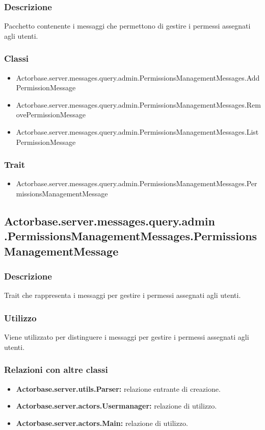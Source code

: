 \documentclass[a4paper]{article}
\begin{document}
			\subsubsection{Descrizione}
				Pacchetto contenente i messaggi che permettono di gestire i permessi assegnati agli utenti.
			\subsubsection{Classi}
				\begin{itemize}
					\item Actorbase.server.messages.query.admin.PermissionsManagementMessages.AddPermissionMessage
					\item Actorbase.server.messages.query.admin.PermissionsManagementMessages.RemovePermissionMessage
					\item Actorbase.server.messages.query.admin.PermissionsManagementMessages.ListPermissionMessage
				\end{itemize}
				
			\subsubsection{Trait}
				\begin{itemize}
					\item Actorbase.server.messages.query.admin.PermissionsManagementMessages.PermissionsManagementMessage
				\end{itemize}
		
		\subsection{Actorbase.server.messages.query.admin \newline
		.PermissionsManagementMessages.PermissionsManagementMessage}
			\subsubsection{Descrizione}
				Trait che rappresenta i messaggi per gestire i permessi assegnati agli utenti.
				
			\subsubsection{Utilizzo}
				Viene utilizzato per distinguere i messaggi per gestire i permessi assegnati agli utenti.
			\subsubsection{Relazioni con altre classi}
				\begin{itemize}
					\item \textbf{Actorbase.server.utils.Parser:} relazione entrante di creazione.
					\item \textbf{Actorbase.server.actors.Usermanager:} relazione di utilizzo.
					\item \textbf{Actorbase.server.actors.Main:} relazione di utilizzo.
				\end{itemize}
\end{document}
